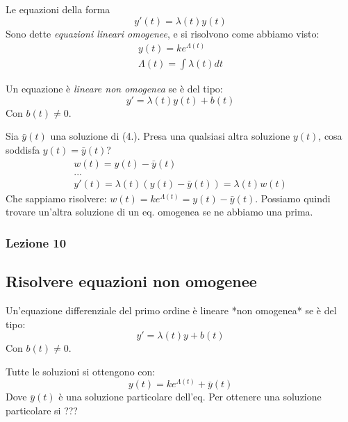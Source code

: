 \begin{definizione}
    Le equazioni della forma
    \begin{equation*}
        y'(t) = \lambda(t)y(t)
    \end{equation*}
    Sono dette \textit{equazioni lineari omogenee}, e si risolvono come abbiamo visto:
    \begin{gather*}
        y(t) = ke^{\Lambda(t)} \\
        \Lambda(t) = \int \lambda(t)dt
    \end{gather*}
\end{definizione}

\begin{definizione}
    Un equazione è \textit{lineare non omogenea} se è del tipo:
    \begin{equation}
        y' = \lambda(t)y(t) + b(t)
    \end{equation}
    Con $b(t) \not= 0$.
\end{definizione}
Sia $\bar{y}(t)$ una soluzione di (4.). Presa una qualsiasi altra soluzione $y(t)$, cosa soddisfa $y(t) = \bar{y}(t)$?
\begin{gather*}
    w(t) = y(t) - \bar{y}(t) \\
    ... \\
    y'(t) = \lambda(t)(y(t)-\bar{y}(t)) = \lambda(t) w(t)
\end{gather*}
Che sappiamo risolvere: $w(t) = ke^{\Lambda(t)} = y(t) - \bar{y}(t)$. Possiamo quindi trovare un'altra soluzione di un eq. omogenea se ne abbiamo una prima.

\subsubsection{Lezione 10}
\subsection{Risolvere equazioni non omogenee}
\begin{definizione}
    Un'equazione differenziale del primo ordine è lineare *non omogenea* se è del tipo:
    \begin{equation}
        y' = \lambda(t) y + b(t)
    \end{equation}
    Con $b(t) \not= 0$.
\end{definizione}

Tutte le soluzioni si ottengono con:
\begin{equation}
    y(t) = ke^{\Lambda(t)} + \bar{y}(t)
\end{equation}
Dove $\bar{y}(t)$ è una soluzione particolare dell'eq. Per ottenere una soluzione particolare si ???

